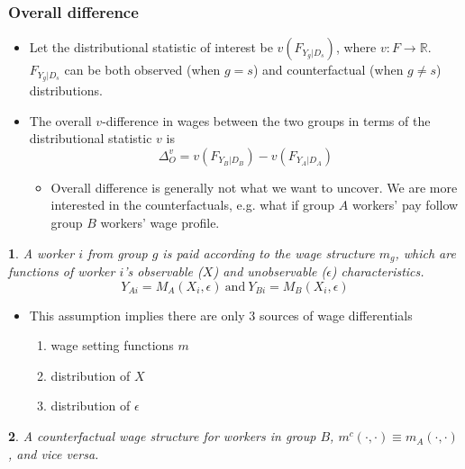 \documentclass[a4paper, 12pt]{article}
\makeatletter
\newcommand{\R}{\mathbb{R}}
\newtheorem*{assumption*}{\assumptionnumber}
\providecommand{\assumptionnumber}{}
\newenvironment{assumption}[2]
 {%
  \renewcommand{\assumptionnumber}{Assumption #1 \textit{(#2)}}%
  \begin{assumption*}%
  \protected@edef\@currentlabel{#1}%
 }
 {%
  \end{assumption*}
 }
\makeatother
\begin{document}
\subsubsection{Overall difference}
\begin{itemize}
\item Let the distributional statistic of interest be $v(F_{Y_g|D_s})$, where $v:F \rightarrow \R$. $F_{Y_g|D_s}$ can be both observed (when $g=s$) and counterfactual (when $g \neq s$) distributions.
\item The overall $v$-difference in wages between the two groups in terms of the distributional statistic $v$ is
\begin{equation}
\Delta^v_O = v(F_{Y_B|D_B}) - v(F_{Y_A|D_A})
\end{equation}
\begin{itemize}
\item Overall difference is generally not what we want to uncover. We are more interested in the counterfactuals, e.g. what if group $A$ workers' pay follow group $B$ workers' wage profile.
\end{itemize}
\end{itemize}

\begin{assumption}{2}{Structural Form}
A worker $i$ from group $g$ is paid according to the wage structure $m_g$, which are functions of worker $i$'s observable ($X$) and unobservable ($\epsilon$) characteristics.
\begin{equation}
Y_{Ai} = M_A(X_i, \epsilon) \ \text{and} \ Y_{Bi} = M_B(X_i, \epsilon)
\end{equation}
\end{assumption}

\begin{itemize}
\item This assumption implies there are only 3 sources of wage differentials
\begin{enumerate}
\item wage setting functions $m$
\item distribution of $X$
\item distribution of $\epsilon$
\end{enumerate}
\end{itemize}

\begin{assumption}{3}{Simple Counterfactual Treatment} A counterfactual wage structure for workers in group $B$, $m^c(\cdot, \cdot) \equiv m_A(\cdot, \cdot)$, and vice versa. 
\end{assumption}
\end{document}
